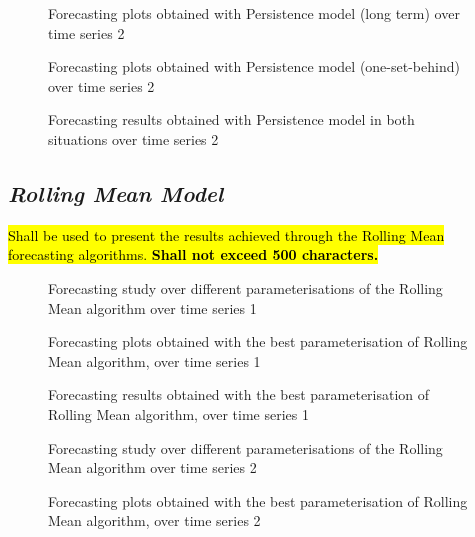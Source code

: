 \documentclass[10pt]{extarticle}
\newcommand{\ctext}[3][RGB]{%
  \begingroup
  \definecolor{hlcolor}{#1}{#2}\sethlcolor{hlcolor}%
  \hl{#3}%
  \endgroup
}
\begin{document}
\begin{figure}[H]
\caption{Forecasting plots obtained with Persistence model (long term) over time series 2}
\end{figure}

\begin{figure}[H]
\caption{Forecasting plots obtained with Persistence model (one-set-behind) over time series 2}
\end{figure}

\begin{figure}[H]
\caption{Forecasting results obtained with Persistence model in both situations over time series 2}
\end{figure}

\subsection*{\textit{Rolling Mean Model}}
\ctext[RGB]{190,190,190}{Shall be used to present the results achieved through the Rolling Mean forecasting algorithms.  \textbf{Shall not exceed 500 characters.}}

\begin{figure}[H]
\caption{Forecasting study over different parameterisations of the Rolling Mean algorithm over time series 1}
\end{figure}

\begin{figure}[H]
\caption{Forecasting plots obtained with the best parameterisation of Rolling Mean algorithm, over time series 1}
\end{figure}

\begin{figure}[H]
\caption{Forecasting results obtained with the best parameterisation of Rolling Mean algorithm, over time series 1}
\end{figure}

\begin{figure}[H]
\caption{Forecasting study over different parameterisations of the Rolling Mean algorithm over time series 2}
\end{figure}

\begin{figure}[H]
\caption{Forecasting plots obtained with the best parameterisation of Rolling Mean algorithm, over time series 2}
\end{figure}
\end{document}
